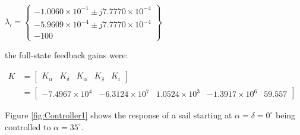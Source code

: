 \documentclass[]{aiaa-tc}%
\begin{document}
	\vspace{5 mm}

{\centering
 $\lambda_i=\begin{Bmatrix}-1.0060\times10^{-1} \pm j7.7770\times10^{-4}\\
-5.9609\times10^{-4} \pm j7.7770\times10^{-4}\\
-100
\end{Bmatrix}$\par
}

	\vspace{5 mm}

\noindent
the full-state feedback gains were:

	\vspace{5 mm}

{\centering
 $\begin{aligned}
K &= \begin{bmatrix}
K_{\alpha} & K_{\delta} & K_{\dot{\alpha}} & K_{\dot{\delta}} & K_i
\end{bmatrix}\\ 
 &= \begin{bmatrix}
-7.4967\times10^4 & -6.3124\times10^7 & 1.0524\times10^3 & -1.3917\times10^6 & 59.557
\end{bmatrix}
\end{aligned}$\par
}

	\vspace{5 mm}

	Figure  \ref{fig:Controller1} shows the response of a sail starting at $\alpha=\delta=0^{\circ}$ being controlled to $\alpha = 35^{\circ}$.

	\vspace{5 mm}
	
\end{document}
